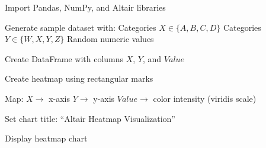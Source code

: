 \begin{algorithm}
\caption{Heatmap Visualization using Altair}
\begin{algorithmic}[1]

\STATE Import Pandas, NumPy, and Altair libraries

\STATE Generate sample dataset with:
\STATE Categories $X \in \{A, B, C, D\}$
\STATE Categories $Y \in \{W, X, Y, Z\}$
\STATE Random numeric values

\STATE Create DataFrame with columns $X$, $Y$, and $Value$

\STATE Create heatmap using rectangular marks

\STATE Map:
\STATE $X \rightarrow$ x-axis
\STATE $Y \rightarrow$ y-axis
\STATE $Value \rightarrow$ color intensity (viridis scale)

\STATE Set chart title: ``Altair Heatmap Visualization''

\STATE Display heatmap chart

\end{algorithmic}
\end{algorithm}